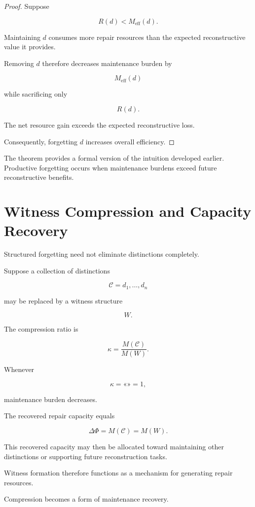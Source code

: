 \documentclass[12pt,oneside]{book}
\theoremstyle{plain} \newtheorem{theorem}{Theorem}[chapter] \newtheorem{lemma}[theorem]{Lemma} \newtheorem{proposition}[theorem]{Proposition} \newtheorem{corollary}[theorem]{Corollary}
\theoremstyle{definition} \newtheorem{definition}[theorem]{Definition} \newtheorem{axiom}[theorem]{Axiom} \newtheorem{construction}[theorem]{Construction}
\theoremstyle{remark} \newtheorem{remark}[theorem]{Remark} \newtheorem{example}[theorem]{Example}
\begin{document}
\begin{proof}

Suppose

\[
R(d)
<
M_{\mathrm{eff}}(d).
\]

Maintaining $d$ consumes more repair resources than the expected reconstructive value it provides.

Removing $d$ therefore decreases maintenance burden by

\[
M_{\mathrm{eff}}(d)
\]

while sacrificing only

\[
R(d).
\]

The net resource gain exceeds the expected reconstructive loss.

Consequently, forgetting $d$ increases overall efficiency.

\end{proof}

The theorem provides a formal version of the intuition developed earlier. Productive forgetting occurs when maintenance burdens exceed future reconstructive benefits.

\section{Witness Compression and Capacity Recovery}

Structured forgetting need not eliminate distinctions completely.

Suppose a collection of distinctions

\[
\mathcal C
=
{d_1,\ldots,d_n}
\]

may be replaced by a witness structure

\[
W.
\]

The compression ratio is

\[
\kappa
=
\frac{M(\mathcal C)}
{M(W)}.
\]

Whenever

\[
\kappa
=
«»
=
1,
\]

maintenance burden decreases.

The recovered repair capacity equals

\[
\Delta\Phi
=
M(\mathcal C)
=
M(W).
\]

This recovered capacity may then be allocated toward maintaining other distinctions or supporting future reconstruction tasks.

Witness formation therefore functions as a mechanism for generating repair resources.

Compression becomes a form of maintenance recovery.
\end{document}
